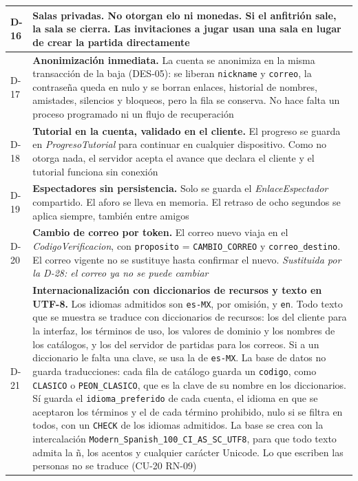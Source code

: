 \begin{center}
\begin{longtable}{|L{0.082\textwidth}|L{0.818\textwidth}|}
\mbox{D-16} & \textbf{Salas privadas.} No otorgan elo ni monedas. Si el anfitrión sale, la sala se cierra. Las invitaciones a jugar usan una sala en lugar de crear la partida directamente \\ \hline
\mbox{D-17} & \textbf{Anonimización inmediata.} La cuenta se anonimiza en la misma transacción de la baja (\mbox{DES-05}): se liberan \texttt{nickname} y \texttt{correo}, la contraseña queda en nulo y se borran enlaces, historial de nombres, amistades, silencios y bloqueos, pero la fila se conserva. No hace falta un proceso programado ni un flujo de recuperación \\ \hline
\mbox{D-18} & \textbf{Tutorial en la cuenta, validado en el cliente.} El progreso se guarda en \textit{ProgresoTutorial} para continuar en cualquier dispositivo. Como no otorga nada, el servidor acepta el avance que declara el cliente y el tutorial funciona sin conexión \\ \hline
\mbox{D-19} & \textbf{Espectadores sin persistencia.} Solo se guarda el \textit{EnlaceEspectador} compartido. El aforo se lleva en memoria. El retraso de ocho segundos se aplica siempre, también entre amigos \\ \hline
\mbox{D-20} & \textbf{Cambio de correo por token.} El correo nuevo viaja en el \textit{CodigoVerificacion}, con \texttt{proposito} = \texttt{CAMBIO\_\allowbreak{}CORREO} y \texttt{correo\_\allowbreak{}destino}. El correo vigente no se sustituye hasta confirmar el nuevo. \textit{Sustituida por la \mbox{D-28}: el correo ya no se puede cambiar} \\ \hline
\mbox{D-21} & \textbf{Internacionalización con diccionarios de recursos y texto en UTF-8.} Los idiomas admitidos son \texttt{es-MX}, por omisión, y \texttt{en}. Todo texto que se muestra se traduce con diccionarios de recursos: los del cliente para la interfaz, los términos de uso, los valores de dominio y los nombres de los catálogos, y los del servidor de partidas para los correos. Si a un diccionario le falta una clave, se usa la de \texttt{es-MX}. La base de datos no guarda traducciones: cada fila de catálogo guarda un \texttt{codigo}, como \texttt{CLASICO} o \texttt{PEON\_\allowbreak{}CLASICO}, que es la clave de su nombre en los diccionarios. Sí guarda el \texttt{idioma\_\allowbreak{}preferido} de cada cuenta, el idioma en que se aceptaron los términos y el de cada término prohibido, nulo si se filtra en todos, con un \texttt{CHECK} de los idiomas admitidos. La base se crea con la intercalación \texttt{Modern\_\allowbreak{}Spanish\_\allowbreak{}100\_\allowbreak{}CI\_\allowbreak{}AS\_\allowbreak{}SC\_\allowbreak{}UTF8}, para que todo texto admita la ñ, los acentos y cualquier carácter Unicode. Lo que escriben las personas no se traduce (\mbox{CU-20} \mbox{RN-09}) \\ \hline
\end{longtable}
\end{center}

